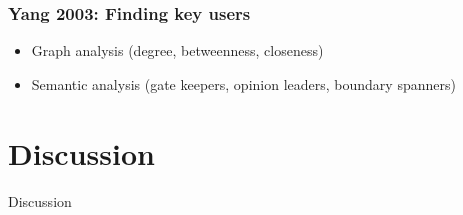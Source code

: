 \documentclass{beamer}
\begin{document}
\begin{frame}
\frametitle{Yang 2003: Finding key users}
\begin{itemize}
\item Graph analysis (degree, betweenness, closeness)
\item Semantic analysis (gate keepers, opinion leaders, boundary spanners)
\end{itemize}
\end{frame}


\section{Discussion}
\begin{frame}
\Huge{\centerline{Discussion}}
\end{frame}

\end{document}
